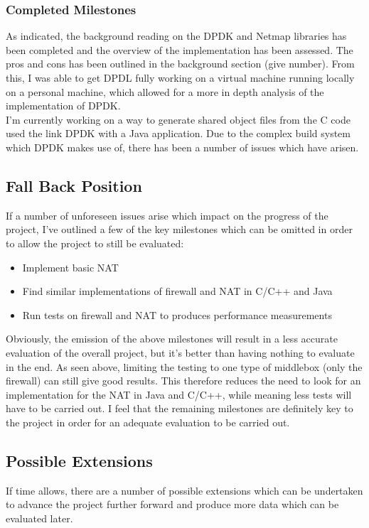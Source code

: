 \documentclass[a4paper, titlepage]{article}
\begin{document}
\subsubsection{Completed Milestones}
As indicated, the background reading on the DPDK and Netmap libraries has been completed and the overview of the implementation has been assessed. The pros and cons has been outlined in the background section (give number). From this, I was able to get DPDL fully working on a virtual machine running locally on a personal machine, which allowed for a more in depth analysis of the implementation of DPDK. \\
\newline
I'm currently working on a way to generate shared object files from the C code used the link DPDK with a Java application. Due to the complex build system which DPDK makes use of, there has been a number of issues which have arisen.

\subsection{Fall Back Position}
If a number of unforeseen issues arise which impact on the progress of the project, I've outlined a few of the key milestones which can be omitted in order to allow the project to still be evaluated:
\begin{itemize}
	\item Implement basic NAT
	\item Find similar implementations of firewall and NAT in C/C++ and Java
	\item Run tests on firewall and NAT to produces performance measurements
\end{itemize}
Obviously, the emission of the above milestones will result in a less accurate evaluation of the overall project, but it's better than having nothing to evaluate in the end. As seen above, limiting the testing to one type of middlebox (only the firewall) can still give good results. This therefore reduces the need to look for an implementation for the NAT in Java and C/C++, while meaning less tests will have to be carried out. I feel that the remaining milestones are definitely key to the project in order for an adequate evaluation to be carried out.

\subsection{Possible Extensions}
If time allows, there are a number of possible extensions which can be undertaken to advance the project further forward and produce more data which can be evaluated later.
\end{document}
